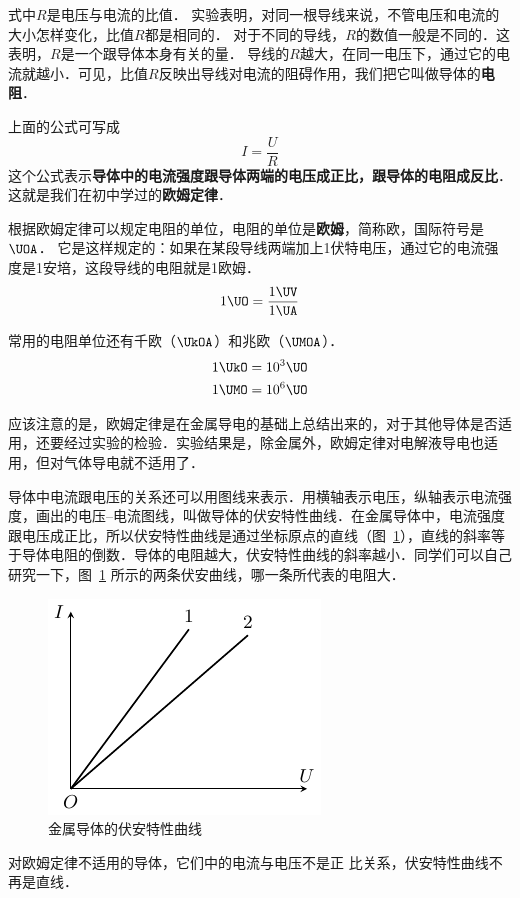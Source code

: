 式中$R$是电压与电流的比值．
实验表明，对同一根导线来说，不管电压和电流的大小怎样变化，比值$R$都是相同的．
对于不同的导线，$R$的数值一般是不同的．这表明，$R$是一个跟导体本身有关的量．
导线的$R$越大，在同一电压下，通过它的电流就越小．可见，比值$R$反映出导线对电流的阻碍作用，我们把它叫做导体的\textbf{电阻}．

上面的公式可写成
\[I=\frac{U}{R}\]
这个公式表示\textbf{导体中的电流强度跟导体两端的电压成正比，跟导体的电阻成反比}．这就是我们在初中学过的\textbf{欧姆定律}．

根据欧姆定律可以规定电阻的单位，电阻的单位是\textbf{欧姆}，简称欧，国际符号是$\UOA$． 它是这样规定的：如果在某段导线两端加上1伏特电压，通过它的电流强度是1安培，这段导线的电阻就是1欧姆．
\[1 \UO =\frac{1 \UV }{1 \UA} \]

常用的电阻单位还有千欧（$\UkOA$）和兆欧（$\UMOA$）．
\[\begin{split}
    1 \UkO &= 10^{3}\UO\\
    1\UMO &=10^{6}\UO
\end{split}\]

应该注意的是，欧姆定律是在金属导电的基础上总结出来的，对于其他导体是否适用，还要经过实验的检验．实验结果是，除金属外，欧姆定律对电解液导电也适用，但对气体导电就不适用了．

导体中电流跟电压的关系还可以用图线来表示．用横轴表示电压，纵轴表示电流强度，画出的电压--电流图线，叫做导体的伏安特性曲线．在金属导体中，电流强度跟电压成正比，所以伏安特性曲线是通过坐标原点的直线（图~\ref{fig_B_7-3}），直线的斜率等于导体电阻的倒数．导体的电阻越大，伏安特性曲线的斜率越小．同学们可以自己研究一下，图~\ref{fig_B_7-3} 所示的两条伏安曲线，哪一条所代表的电阻大．
\begin{figure}[htbp]
    \centering
    \includegraphics{fig/B/7-3.pdf}
    \caption{金属导体的伏安特性曲线}\label{fig_B_7-3}
\end{figure}


对欧姆定律不适用的导体，它们中的电流与电压不是正
比关系，伏安特性曲线不再是直线．

